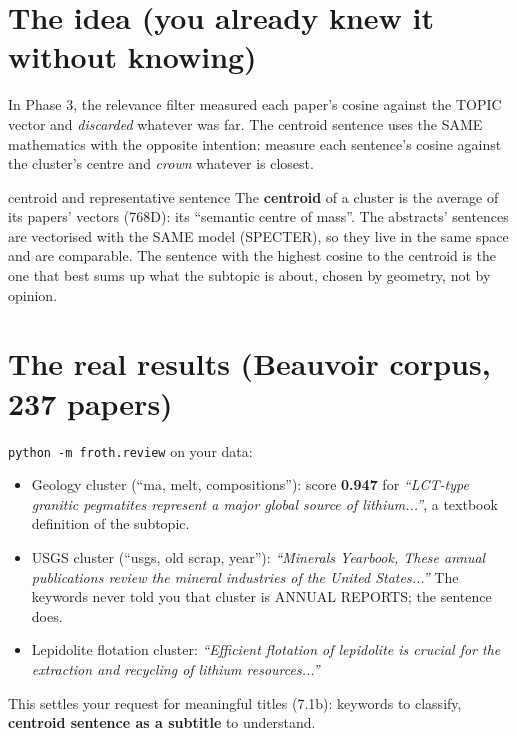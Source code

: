 \documentclass[11pt,a4paper]{article}
\begin{document}

\section{The idea (you already knew it without knowing)}

In Phase 3, the relevance filter measured each paper's cosine against the TOPIC vector and
\emph{discarded} whatever was far. The centroid sentence uses the SAME mathematics with the
opposite intention: measure each sentence's cosine against the cluster's centre and
\emph{crown} whatever is closest.

\begin{concepto}{centroid and representative sentence}
The \textbf{centroid} of a cluster is the average of its papers' vectors (768D): its ``semantic
centre of mass''. The abstracts' sentences are vectorised with the SAME model (SPECTER), so
they live in the same space and are comparable. The sentence with the highest cosine to the
centroid is the one that best sums up what the subtopic is about, chosen by geometry, not by
opinion.
\end{concepto}

\section{The real results (Beauvoir corpus, 237 papers)}

\texttt{python -m froth.review} on your data:

\begin{itemize}
  \item Geology cluster (``ma, melt, compositions''): score \textbf{0.947} for
        \emph{``LCT-type granitic pegmatites represent a major global source of
        lithium...''}, a textbook definition of the subtopic.
  \item USGS cluster (``usgs, old scrap, year''): \emph{``Minerals Yearbook, These annual
        publications review the mineral industries of the United States...''} The keywords
        never told you that cluster is ANNUAL REPORTS; the sentence does.
  \item Lepidolite flotation cluster: \emph{``Efficient flotation of lepidolite is crucial for
        the extraction and recycling of lithium resources...''}
\end{itemize}

This settles your request for meaningful titles (7.1b): keywords to classify, \textbf{centroid
sentence as a subtitle} to understand.
\end{document}

